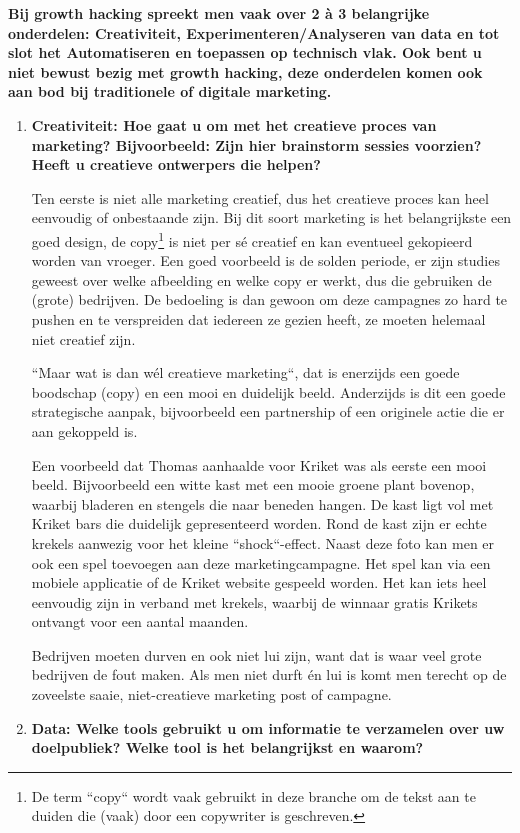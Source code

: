 \textbf{Bij growth hacking spreekt men vaak over 2 à 3 belangrijke onderdelen: Creativiteit, Experimenteren/Analyseren van data en tot slot het Automatiseren en toepassen op technisch vlak. Ook bent u niet bewust bezig met growth hacking, deze onderdelen komen ook aan bod bij traditionele of digitale marketing.}
\begin{enumerate}[label*=\arabic*.]
	\item \textbf{Creativiteit: Hoe gaat u om met het creatieve proces van marketing? Bijvoorbeeld: Zijn hier brainstorm sessies voorzien? Heeft u creatieve ontwerpers die helpen?}
	
	Ten eerste is niet alle marketing creatief, dus het creatieve proces kan heel eenvoudig of onbestaande zijn. Bij dit soort marketing is het belangrijkste een goed design, de copy\footnote{De term ``copy`` wordt vaak gebruikt in deze branche om de tekst aan te duiden die (vaak) door een copywriter is geschreven.} is niet per sé creatief en kan eventueel gekopieerd worden van vroeger. Een goed voorbeeld is de solden periode, er zijn studies geweest over welke afbeelding en welke copy er werkt, dus die gebruiken de (grote) bedrijven. De bedoeling is dan gewoon om deze campagnes zo hard te pushen en te verspreiden dat iedereen ze gezien heeft, ze moeten helemaal niet creatief zijn.
	
	``Maar wat is dan wél creatieve marketing``, dat is enerzijds een goede boodschap (copy) en een mooi en duidelijk beeld. Anderzijds is dit een goede strategische aanpak, bijvoorbeeld een partnership of een originele actie die er aan gekoppeld is.
	
	Een voorbeeld dat Thomas aanhaalde voor Kriket was als eerste een mooi beeld. Bijvoorbeeld een witte kast met een mooie groene plant bovenop, waarbij bladeren en stengels die naar beneden hangen. De kast ligt vol met Kriket bars die duidelijk gepresenteerd worden. Rond de kast zijn er echte krekels aanwezig voor het kleine ``shock``-effect. Naast deze foto kan men er ook een spel toevoegen aan deze marketingcampagne. Het spel kan via een mobiele applicatie of de Kriket website gespeeld worden. Het kan iets heel eenvoudig zijn in verband met krekels, waarbij de winnaar gratis Krikets ontvangt voor een aantal maanden.
	
	Bedrijven moeten durven en ook niet lui zijn, want dat is waar veel grote bedrijven de fout maken. Als men niet durft én lui is komt men terecht op de zoveelste saaie, niet-creatieve marketing post of campagne.
	
	\item \textbf{Data: Welke tools gebruikt u om informatie te verzamelen over uw doelpubliek? Welke tool is het belangrijkst en waarom?}
	

\end{enumerate}
